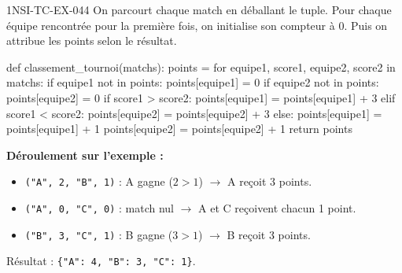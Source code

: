 \begin{corrige}{1NSI-TC-EX-044}
On parcourt chaque match en déballant le tuple. Pour chaque équipe rencontrée pour la première fois, on initialise son compteur à 0. Puis on attribue les points selon le résultat.

\begin{python}
def classement_tournoi(matchs):
    points = {}
    for equipe1, score1, equipe2, score2 in matchs:
        if equipe1 not in points:
            points[equipe1] = 0
        if equipe2 not in points:
            points[equipe2] = 0
        if score1 > score2:
            points[equipe1] = points[equipe1] + 3
        elif score1 < score2:
            points[equipe2] = points[equipe2] + 3
        else:
            points[equipe1] = points[equipe1] + 1
            points[equipe2] = points[equipe2] + 1
    return points
\end{python}

\textbf{Déroulement sur l'exemple :}
\begin{itemize}
  \item \lstinline{("A", 2, "B", 1)} : A gagne ($2 > 1$) $\to$ A reçoit 3 points.
  \item \lstinline{("A", 0, "C", 0)} : match nul $\to$ A et C reçoivent chacun 1 point.
  \item \lstinline{("B", 3, "C", 1)} : B gagne ($3 > 1$) $\to$ B reçoit 3 points.
\end{itemize}

Résultat : \lstinline|{"A": 4, "B": 3, "C": 1}|.
\end{corrige}
